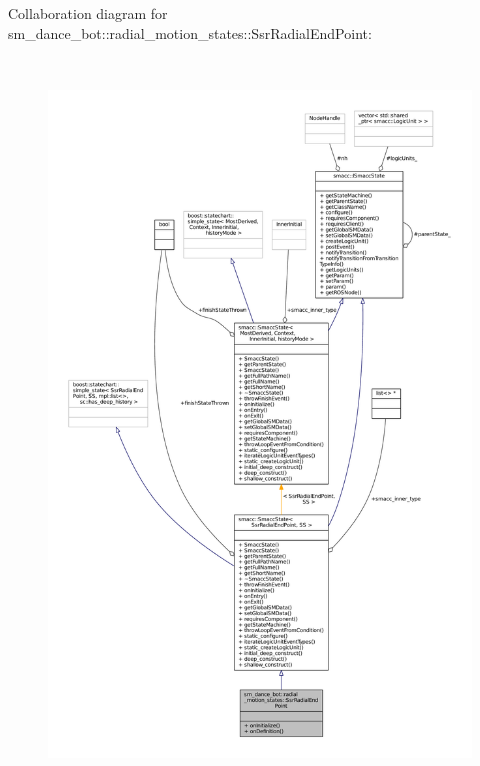 Collaboration diagram for sm\+\_\+dance\+\_\+bot\+:\+:radial\+\_\+motion\+\_\+states\+:\+:Ssr\+Radial\+End\+Point\+:
\nopagebreak
\begin{figure}[H]
\begin{center}
\leavevmode
\includegraphics[height=550pt]{structsm__dance__bot_1_1radial__motion__states_1_1SsrRadialEndPoint__coll__graph}
\end{center}
\end{figure}
